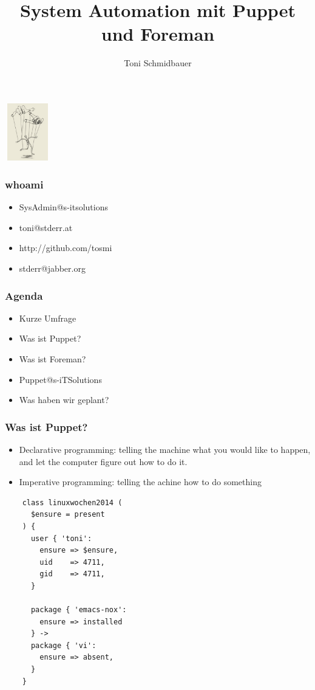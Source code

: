 \documentclass{beamer}
\title{System Automation mit Puppet und Foreman\\}
\author{Toni Schmidbauer}
\begin{document}
\begin{frame}
\center\includegraphics[height=2.5cm,width=2cm]{../pics/puppet.png}
\titlepage

\end{frame}

\begin{frame}
  \frametitle{whoami}
  \begin{itemize}
  \item SysAdmin@s-itsolutions
  \item toni@stderr.at
  \item http://github.com/tosmi
  \item stderr@jabber.org
  \end{itemize}
\end{frame}
\begin{frame}

  \frametitle{Agenda}

  \begin{itemize}
  \item Kurze Umfrage
  \item Was ist Puppet?
  \item Was ist Foreman?
  \item Puppet@s-iTSolutions
  \item Was haben wir geplant?
  \end{itemize}

\end{frame}

\begin{frame}
\end{frame}

\begin{frame}[fragile]
  \frametitle{Was ist Puppet?}

  \begin{itemize}
  \item Declarative programming: telling the machine what you would
    like to happen, and let the computer figure out how to do it.
  \item \tiny{Imperative programming: telling the achine how to do
    something}
  \end{itemize}

  \begin{lstlisting}
    class linuxwochen2014 (
      $ensure = present
    ) {
      user { 'toni':
        ensure => $ensure,
        uid    => 4711,
        gid    => 4711,
      }

      package { 'emacs-nox':
        ensure => installed
      } ->
      package { 'vi':
        ensure => absent,
      }
    }
  \end{lstlisting}
\end{frame}
\end{document}
